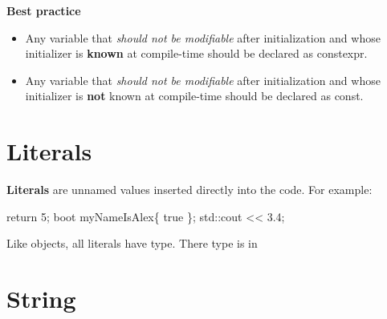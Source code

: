 \documentclass[
  letterpaper,
  DIV=11,
  numbers=noendperiod]{scrreprt}
\newenvironment{Shaded}{\begin{snugshade}}{\end{snugshade}}
\newcommand{\DecValTok}[1]{\textcolor[rgb]{0.68,0.00,0.00}{#1}}
\newcommand{\ErrorTok}[1]{\textcolor[rgb]{0.68,0.00,0.00}{#1}}
\newcommand{\FloatTok}[1]{\textcolor[rgb]{0.68,0.00,0.00}{#1}}
\newcommand{\NormalTok}[1]{\textcolor[rgb]{0.00,0.23,0.31}{#1}}
\newcommand{\SpecialCharTok}[1]{\textcolor[rgb]{0.37,0.37,0.37}{#1}}
\providecommand{\tightlist}{%
  \setlength{\itemsep}{0pt}\setlength{\parskip}{0pt}}\usepackage{longtable,booktabs,array}
\begin{document}
\begin{tcolorbox}[enhanced jigsaw, toprule=.15mm, rightrule=.15mm, opacityback=0, breakable, leftrule=.75mm, colback=white, colframe=quarto-callout-tip-color-frame, arc=.35mm, left=2mm, bottomrule=.15mm]
\begin{minipage}[t]{5.5mm}
\textcolor{quarto-callout-tip-color}{\faLightbulb}
\end{minipage}%
\begin{minipage}[t]{\textwidth - 5.5mm}

\textbf{Best practice}\vspace{2mm}

\begin{itemize}
\tightlist
\item
  Any variable that \emph{should not be modifiable} after initialization
  and whose initializer is \textbf{known} at compile-time should be
  declared as constexpr.
\item
  Any variable that \emph{should not be modifiable} after initialization
  and whose initializer is \textbf{not} known at compile-time should be
  declared as const.
\end{itemize}

\end{minipage}%
\end{tcolorbox}

\hypertarget{literals-1}{%
\section{Literals}\label{literals-1}}

\textbf{Literals} are unnamed values inserted directly into the code.
For example:

\begin{Shaded}
\begin{Highlighting}[]
\NormalTok{return }\DecValTok{5}\NormalTok{;}
\NormalTok{boot myNameIsAlex\{ true \};}
\NormalTok{std}\SpecialCharTok{::}\NormalTok{cout }\SpecialCharTok{\textless{}}\ErrorTok{\textless{}} \FloatTok{3.4}\NormalTok{;}
\end{Highlighting}
\end{Shaded}

Like objects, all literals have type. There type is in

\hypertarget{string}{%
\section{String}\label{string}}
\end{document}
